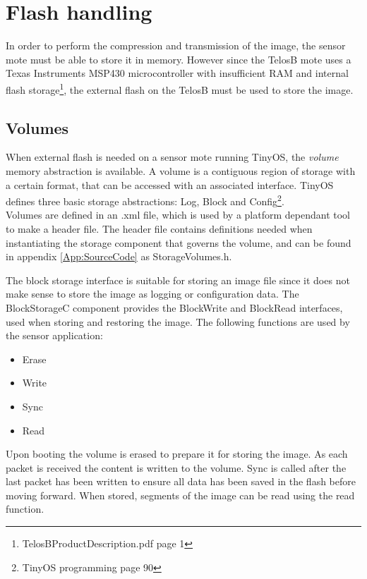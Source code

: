 \section{Flash handling}

In order to perform the compression and transmission of the image, the sensor mote must be able to store it in memory. However since the TelosB mote uses a Texas Instruments  MSP430 microcontroller with insufficient RAM and internal flash storage\footnote{TelosBProductDescription.pdf\cite{telosbProductDesc} page 1}, the external flash on the TelosB must be used to store the image.

\subsection{Volumes}
When external flash is needed on a sensor mote running TinyOS, the \emph{volume} memory abstraction is available. A volume is a contiguous region of storage with a certain format, that can be accessed with an associated interface. TinyOS defines three basic storage abstractions: Log, Block and Config\footnote{TinyOS programming\cite{tinyOSprog} page 90}.
\\Volumes are defined in an .xml file, which is used by a platform dependant tool to make a header file. The header file contains definitions needed when instantiating the storage component that governs the volume, and can be found in appendix \ref{App:SourceCode} as StorageVolumes.h.   

The block storage interface is suitable for storing an image file since it does not make sense to store the image as logging or configuration data. The BlockStorageC component provides the BlockWrite and BlockRead interfaces, used when storing and restoring the image. The following functions are used by the sensor application:

\newpage
\begin{itemize}
\item Erase
\item Write
\item Sync
\item Read
\end{itemize}  

Upon booting the volume is erased to prepare it for storing the image. As each packet is received the content is written to the volume. Sync is called after the last packet has been written to ensure all data has been saved in the flash before moving forward. When stored, segments of the image can be read using the read function.






 

   